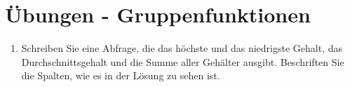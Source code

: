 \clearpage
    \section{Übungen - Gruppenfunktionen}
      \begin{enumerate}
        \item Schreiben Sie eine Abfrage, die das höchste und das niedrigste
        Gehalt, das Durchschnittsgehalt und die Summe aller Gehälter ausgibt.
        Beschriften Sie die Spalten, wie es in der Lösung zu sehen ist.
        \begin{center}
          \begin{small}
            \tablehead{}


\end{small}
\end{center}
\end{enumerate}
